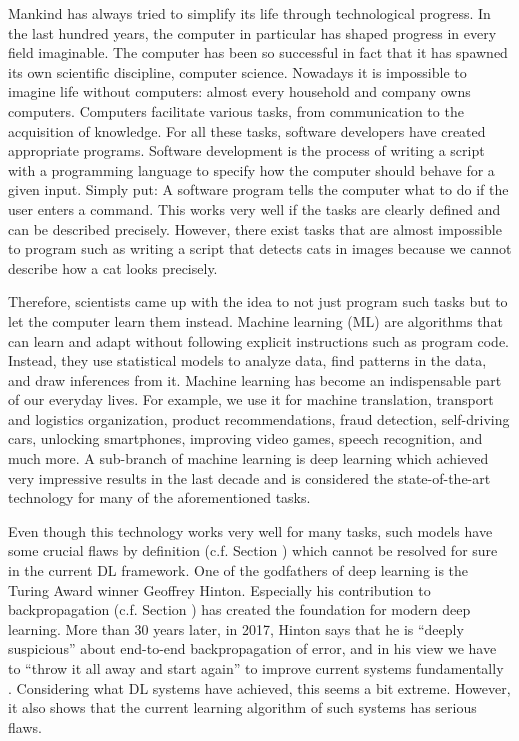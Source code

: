 Mankind has always tried to simplify its life through technological progress.
In the last hundred years, the computer in particular has shaped progress in every field imaginable. 
The computer has been so successful in fact that it has spawned its own scientific discipline, computer science.
Nowadays it is impossible to imagine life without computers: almost every household and company owns computers.
Computers facilitate various tasks, from communication to the acquisition of knowledge.
For all these tasks, software developers have created appropriate programs.
Software development is the process of writing a script with a programming language to specify how the computer should behave for a given input.
Simply put: A software program tells the computer what to do if the user enters a command.
This works very well if the tasks are clearly defined and can be described precisely.
However, there exist tasks that are almost impossible to program such as writing a script that detects cats in images because we cannot describe how a cat looks precisely.

Therefore, scientists came up with the idea to not just program such tasks but to let the computer learn them instead.
Machine learning (ML) are algorithms that can learn and adapt without following explicit instructions such as program code.
Instead, they use statistical models to analyze data, find patterns in the data, and draw inferences from it.
Machine learning has become an indispensable part of our everyday lives.
For example, we use it for machine translation, transport and logistics organization, product recommendations, fraud detection, self-driving cars, unlocking smartphones, improving video games, speech recognition, and much more.
A sub-branch of machine learning is deep learning which achieved very impressive results in the last decade and is considered the state-of-the-art technology for many of the aforementioned tasks.

Even though this technology works very well for many tasks, such models have some crucial flaws by definition (c.f. Section ) which cannot be resolved for sure in the current DL framework.
One of the godfathers of deep learning is the Turing Award winner Geoffrey Hinton. 
Especially his contribution to backpropagation (c.f. Section ) has created the foundation for modern deep learning.
More than 30 years later, in 2017, Hinton says that he is ``deeply suspicious'' about end-to-end backpropagation of error, and in his view we have to ``throw it all away and start again'' to improve current systems fundamentally .
Considering what DL systems have achieved, this seems a bit extreme.
However, it also shows that the current learning algorithm of such systems has serious flaws.

